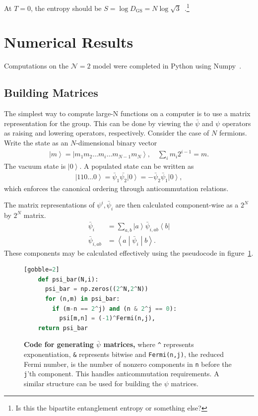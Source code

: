 \documentclass[12pt]{article} %
\renewcommand{\cal}{\mathcal}
\newcommand{\ket}[1]{\left|#1\right\rangle}
\newcommand{\bra}[1]{\left\langle#1\right|}
\newcommand{\brakett}[3]{\left\langle#1\middle|#2\middle|#3\right\rangle}
\newcommand{\nn}{\nonumber\\}
\begin{document}
At $T=0$, the entropy should be $S = \log D_\text{GS} = N\log\sqrt{3} $~\cite{fu16}.\footnote{Is this the bipartite entanglement entropy or something else?}

\section{Numerical Results} \label{sec:numeric}

Computations on the $\cal N=2$ model were completed in Python using Numpy~\cite{vander11}.

\subsection{Building Matrices}\emph{} \label{sub:build_mat}

The simplest way to compute large-N functions on a computer is to use a matrix representation for the group. This can be done by viewing the $\bar \psi$ and $\psi$ operators as raising and lowering operators, respectively. Consider the case of $N$ fermions. Write the state as an $N$-dimensional binary vector
\begin{align}
\ket{m} = \ket{m_1m_2\dots m_i\dots m_{N-1}m_N}, \quad\sum_im_i2^{i-1} =
	m.\label{eqn:2Nstate}
\end{align}
The vacuum state is $\ket{0}$. A populated state can be written as
\begin{align}
\ket{110\dots 0} = \bar\psi_1\bar{\psi_2}\ket{0} =-\bar\psi_2\bar\psi_1\ket{0},
\end{align}
which enforces the canonical ordering through anticommutation relations. 

The matrix representations of $\psi^i, \bar \psi_i$ are then calculated component-wise as a $2^N$ by $2^N$ matrix.
\begin{align}
\bar\psi_i &= \sum_{a,b}\ket{a}\bar\psi_{i,ab}\bra{b}\nn
\bar\psi_{i,ab} &= \brakett{a}{\bar\psi_i}{b}.\label{eqn:comps}
\end{align}
These components may be calculated effectively using the pseudocode in figure~\ref{code:psibar}.

\begin{figure}[ht]
	\begin{lstlisting}[language=python][gobble=2]
    def psi_bar(N,i):
      psi_bar = np.zeros((2^N,2^N))
      for (n,m) in psi_bar:
        if (m-n == 2^j) and (n & 2^j == 0): 
          psi[m,n] = (-1)^Fermi(n,j),
    return psi_bar
	\end{lstlisting}
	\cprotect\caption{\textbf{Code for generating $\bar \psi$ matrices,} where \verb|^| represents exponentiation, \verb|&| represents bitwise and \verb|Fermi(n,j)|, the reduced Fermi number, is the number of nonzero components in \verb|n| before the \verb|j|'th component. This handles anticommutation requirements. A similar structure can be used for building the $\psi$ matrices.}
	\label{code:psibar}
\end{figure}
\end{document}
